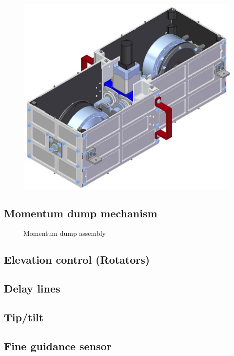 \begin{figure}[!ht]
	\centering
	\includegraphics[width=\textwidth]{Figures/CCMG-case.png}
	\caption{}
	\label{fig:CCMGcase}
    \end{figure}


\subsection{Momentum dump mechanism}
\label{subsec:chap3momdumpmotor}

\begin{figure}[!ht]
	\centering
	
	\caption[Momentum dump assembly]{Momentum dump assembly}
	\label{fig:rotator}
    \end{figure}


\subsection{Elevation control (Rotators)}
\subsection{Delay lines}
\subsection{Tip/tilt}
\subsection{Fine guidance sensor}



